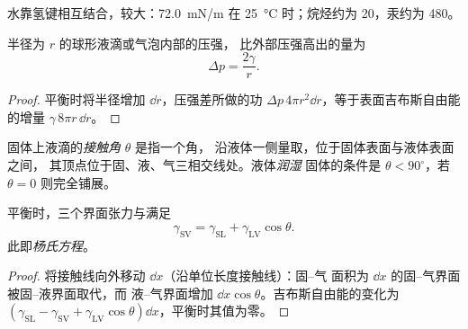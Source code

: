 水靠氢键相互结合，较大：\qty{72.0}{mN/m}
在 \qty{25}{\celsius} 时；烷烃约为 20，汞约为 480。

\begin{proposition}[拉普拉斯压强]\label{prop:b3:colloids:laplace}
半径为 $r$ 的球形液滴或气泡内部的压强，
比外部压强高出的量为
\[
  \Delta p = \frac{2\gamma}{r} .
\]
\end{proposition}

\begin{proof}
平衡时将半径增加 $\dd r$，压强差所做的功
$\Delta p\,4\pi r^2\dd r$，等于表面吉布斯自由能的增量 $\gamma\,8\pi r\,\dd r$。
\end{proof}

\begin{definition}[接触角、润湿]\label{def:b3:colloids:wetting}
固体上液滴的\emph{接触角} $\theta$ 是指一个角，
沿液体一侧量取，位于固体表面与液体表面之间，
其顶点位于固、液、气三相交线处。液体\emph{润湿}
固体的条件是 $\theta < 90^\circ$，若 $\theta = 0$ 则完全铺展。
\end{definition}

\begin{theorem}[杨氏方程]\label{thm:b3:colloids:young}
平衡时，三个界面张力与满足
\[
  \gamma_{\mathrm{SV}} = \gamma_{\mathrm{SL}} + \gamma_{\mathrm{LV}}\cos\theta .
\]
此即\emph{杨氏方程}。
\end{theorem}

\begin{proof}
将接触线向外移动 $\dd x$（沿单位长度接触线）：固–气
面积为 $\dd x$ 的固–气界面被固–液界面取代，而
液–气界面增加 $\dd x\cos\theta$。吉布斯自由能的变化为
$(\gamma_{\mathrm{SL}} - \gamma_{\mathrm{SV}} + \gamma_{\mathrm{LV}}\cos\theta)\dd x$，平衡时其值为零。
\end{proof}

